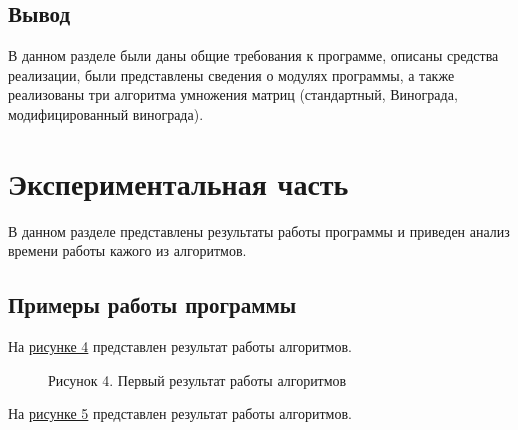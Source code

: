 \documentclass[12pt]{report}
\begin{document}
	\section{Вывод}
	В данном разделе были даны общие требования к программе, описаны средства реализации, были представлены сведения о модулях программы, а также реализованы три алгоритма умножения матриц (стандартный, Винограда, модифицированный винограда).
	
	\chapter{Экспериментальная часть}
	В данном разделе представлены результаты работы программы и приведен анализ времени работы кажого из алгоритмов.
	\section{Примеры работы программы}
	На \hyperref[Result1]{рисунке 4} представлен результат работы алгоритмов.
	\begin{figure}[h!]\label{Result1}
		\caption*{Рисунок 4. Первый результат работы алгоритмов}
	\end{figure}
	\newpage
	На \hyperref[Result2]{рисунке 5} представлен результат работы алгоритмов.
\end{document}
